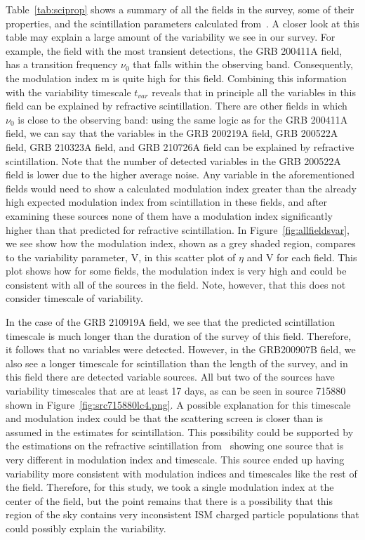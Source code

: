 \documentclass[12pt]{article}
\begin{document}
Table~\ref{tab:sciprop} shows a summary of all the fields in the survey, some of their properties, and the scintillation parameters calculated from~\citet{2019arXiv190708395H}. A closer look at this table may explain a large amount of the variability we see in our survey. For example, the field with the most transient detections, the GRB 200411A field, has a transition frequency $\nu_0$ that falls within the observing band. Consequently, the modulation index m is quite high for this field. Combining this information with the variability timescale $t_{var}$ reveals that in principle all the variables in this field can be explained by refractive scintillation. There are other fields in which $\nu_0$ is close to the observing band: using the same logic as for the GRB 200411A field, we can say that the variables in the GRB 200219A field, GRB 200522A field, GRB 210323A field, and GRB 210726A field can be explained by refractive scintillation. Note that the number of detected variables in the GRB 200522A field is lower due to the higher average noise. Any variable in the aforementioned fields would need to show a calculated modulation index greater than the already high expected modulation index from scintillation in these fields, and after examining these sources none of them have a modulation index significantly higher than that predicted for refractive scintillation. In Figure~\ref{fig:allfieldsvar}, we see show how the modulation index, shown as a grey shaded region, compares to the variability parameter, V, in this scatter plot of $\eta$ and V for each field. This plot shows how for some fields, the modulation index is very high and could be consistent with all of the sources in the field. Note, however, that this does not consider timescale of variability.

In the case of the GRB 210919A field, we see that the predicted scintillation timescale is much longer than the duration of the survey of this field. Therefore, it follows that no variables were detected. However, in the GRB200907B field, we also see a longer timescale for scintillation than the length of the survey, and in this field there are detected variable sources. All but two of the sources have variability timescales that are at least 17 days, as can be seen in source 715880 shown in Figure~\ref{fig:src715880lc4.png}. A possible explanation for this timescale and modulation index could be that the scattering screen is closer than is assumed in the estimates for scintillation. This possibility could be supported by the estimations on the refractive scintillation from~\citet{2019arXiv190708395H} showing one source that is very different in modulation index and timescale. This source ended up having variability more consistent with modulation indices and timescales like the rest of the field. Therefore, for this study, we took a single modulation index at the center of the field, but the point remains that there is a possibility that this region of the sky contains very inconsistent ISM charged particle populations that could possibly explain the variability.
\end{document}
